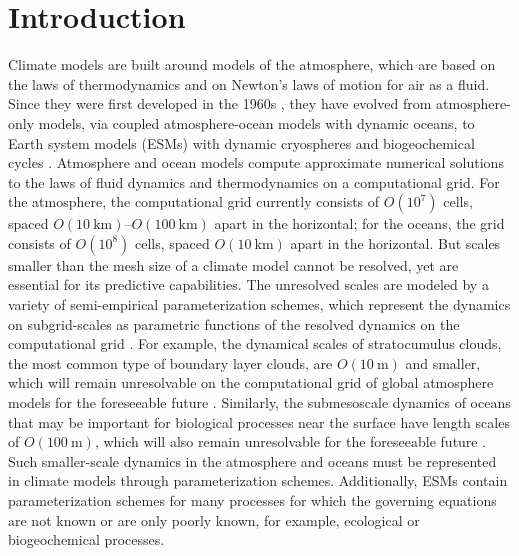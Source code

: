 \documentclass[draft]{agujournal}
\begin{document}
\section{Introduction}

Climate models are built around models of the atmosphere, which are based on the laws of thermodynamics and on Newton's laws of motion for air as a fluid. Since they were first developed in the 1960s \citep{Smagorinsky63, Smagorinsky65, Manabe65, Mintz65a, Kasahara67a}, they have evolved from atmosphere-only models, via coupled atmosphere-ocean models with dynamic oceans, to Earth system models (ESMs) with dynamic cryospheres and biogeochemical cycles \citep{Bretherton12a, ipcc13}. Atmosphere and ocean models compute approximate numerical solutions to the laws of fluid dynamics and thermodynamics on a computational grid. For the atmosphere, the computational grid currently consists of $O(10^7)$ cells, spaced $O(10~\mathrm{km})$--$O(100~\mathrm{km})$ apart in the horizontal; for the oceans, the grid consists of $O(10^8)$ cells, spaced $O(10~\mathrm{km})$ apart in the horizontal. But scales smaller than the mesh size of a climate model cannot be resolved, yet are essential for its predictive capabilities. The unresolved scales are modeled by a variety of semi-empirical parameterization schemes, which represent the dynamics on subgrid-scales as parametric functions of the resolved dynamics on the computational grid \citep{Stensrud07a}. For example, the dynamical scales of stratocumulus clouds, the most common type of boundary layer clouds, are $O(10~\mathrm{m})$ and smaller, which will remain unresolvable on the computational grid of global atmosphere models for the foreseeable future \citep{Wood12a,Schneider17a}. Similarly, the submesoscale dynamics of oceans that may be important for biological processes near the surface have length scales of $O(100~\mathrm{m})$, which will also remain unresolvable for the foreseeable future \citep{Fox-Kemper14a}. Such smaller-scale dynamics in the atmosphere and oceans must be represented in climate models through parameterization schemes. Additionally, ESMs contain parameterization schemes for many processes for which the governing equations are not known or are only poorly known, for example, ecological or biogeochemical processes.
\end{document}
